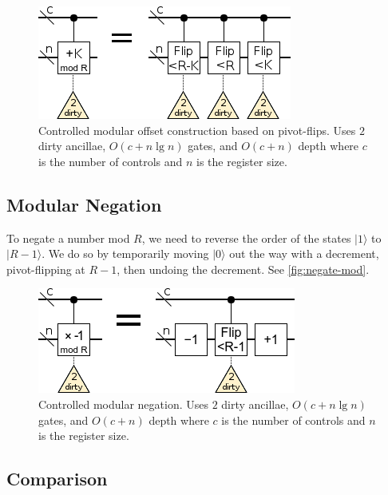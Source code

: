 \documentclass[twocolumn,longbibliography]{quantumarticle-customized}
\begin{document}
\begin{figure}
  \centering
  \includegraphics[width=\linewidth]{assets/controlled-modular-offset.png}
  \caption{
    Controlled modular offset construction based on pivot-flips.
    Uses $2$ dirty ancillae, $O(c + n \lg n)$ gates, and $O(c + n)$ depth where $c$ is the number of controls and $n$ is the register size.
  }
  \label{fig:controlled-modular-offset}
\end{figure}


\subsection{Modular Negation}

To negate a number mod $R$, we need to reverse the order of the states $|1\rangle$ to $|R-1\rangle$.
We do so by temporarily moving $|0\rangle$ out the way with a decrement, pivot-flipping at $R-1$, then undoing the decrement.
See \autoref{fig:negate-mod}.

\begin{figure}
  \centering
  \includegraphics[width=\linewidth]{assets/negate-mod.png}
  \caption{
    Controlled modular negation.
    Uses $2$ dirty ancillae, $O(c + n \lg n)$ gates, and $O(c + n)$ depth where $c$ is the number of controls and $n$ is the register size.
  }
  \label{fig:negate-mod}
\end{figure}


\subsection{Comparison}
\end{document}
